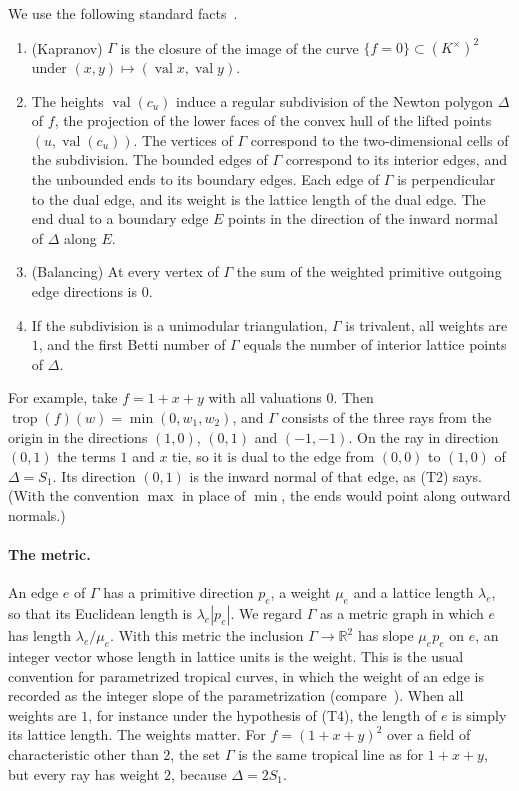 \documentclass[12pt,letterpaper]{article}
\numberwithin{equation}{section}
\theoremstyle{definition}
\theoremstyle{remark}
\newcommand{\R}{\mathbb{R}}
\begin{document}
We use the following standard facts~\cite[Ch.~3]{MS15}.
\begin{enumerate}[label=(T\arabic*)]
\item (Kapranov) $\Gamma$ is the closure of the image of the curve
$\{f=0\}\subset(K^\times)^2$ under $(x,y)\mapsto(\operatorname{val}x,\operatorname{val}y)$.
\item The heights $\operatorname{val}(c_u)$ induce a regular subdivision of the
Newton polygon $\Delta$ of $f$, the projection of the lower faces of the convex
hull of the lifted points $(u,\operatorname{val}(c_u))$. The vertices of $\Gamma$
correspond to the two-dimensional cells of the subdivision. The bounded edges
of $\Gamma$ correspond to its interior edges, and the unbounded ends to its
boundary edges. Each edge of $\Gamma$ is perpendicular to the dual edge, and
its weight is the lattice length of the dual edge. The end dual to a boundary
edge $E$ points in the direction of the inward normal of $\Delta$ along $E$.
\item (Balancing) At every vertex of $\Gamma$ the sum of the weighted primitive
outgoing edge directions is $0$.
\item If the subdivision is a unimodular triangulation, $\Gamma$ is trivalent,
all weights are $1$, and the first Betti number of $\Gamma$ equals the number
of interior lattice points of $\Delta$.
\end{enumerate}
For example, take $f=1+x+y$ with all valuations $0$. Then
$\operatorname{trop}(f)(w)=\min(0,w_1,w_2)$, and $\Gamma$ consists of the
three rays from the origin in the directions $(1,0)$, $(0,1)$ and $(-1,-1)$.
On the ray in direction $(0,1)$ the terms $1$ and $x$ tie, so it is dual to
the edge from $(0,0)$ to $(1,0)$ of $\Delta=S_1$. Its direction $(0,1)$ is the
inward normal of that edge, as (T2) says. (With the convention $\max$ in place
of $\min$, the ends would point along outward normals.)

\paragraph{The metric.}
An edge $e$ of $\Gamma$ has a primitive direction $p_e$, a weight $\mu_e$ and
a lattice length $\lambda_e$, so that its Euclidean length is
$\lambda_e|p_e|$. We regard $\Gamma$ as a metric graph in which $e$ has
length $\lambda_e/\mu_e$. With this metric the inclusion $\Gamma\to\R^2$ has
slope $\mu_ep_e$ on $e$, an integer vector whose length in lattice units is
the weight. This is the usual convention for parametrized tropical curves,
in which the weight of an edge is recorded as the integer slope of the
parametrization (compare~\cite{Mi05}). When all weights are $1$, for instance under the
hypothesis of (T4), the length of $e$ is simply its lattice length. The
weights matter. For $f=(1+x+y)^2$ over a field of characteristic other than
$2$, the set $\Gamma$ is the same tropical line as for $1+x+y$, but every ray
has weight $2$, because $\Delta=2S_1$.
\end{document}
